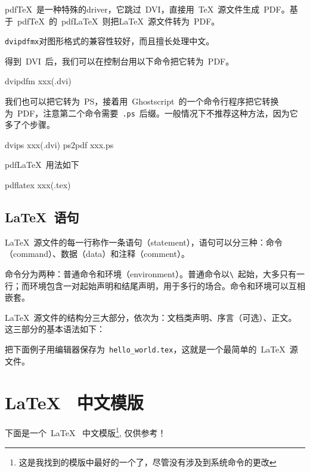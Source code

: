 pdf\TeX~是一种特殊的driver，它跳过~DVI，直接用~\TeX~源文件生成~PDF。基于~pdf\TeX~的~pdf\LaTeX~则把\LaTeX~源文件转为~PDF。

\verb|dvipdfmx|对图形格式的兼容性较好，而且擅长处理中文。

得到~DVI~后，我们可以在控制台用以下命令把它转为~PDF。
\begin{code}
dvipdfm xxx(.dvi)
\end{code}

我们也可以把它转为~PS，接着用~Ghostscript~的一个命令行程序把它转换为~PDF，注意第二个命令需要~\verb|.ps|~后缀。一般情况下不推荐这种方法，因为它多了个步骤。
\begin{code}
dvips xxx(.dvi)
ps2pdf xxx.ps
\end{code}

pdf\LaTeX~用法如下
\begin{code}
pdflatex xxx(.tex)
\end{code}

\subsection{\LaTeX~语句}
\LaTeX~源文件的每一行称作一条语句（statement），语句可以分三种：命令（command）、数据（data）和注释（comment）。

命令分为两种：普通命令和环境（environment）。普通命令以\verb|\|~起始，大多只有一行；而环境包含一对起始声明和结尾声明，用于多行的场合。命令和环境可以互相嵌套。

\LaTeX~源文件的结构分三大部分，依次为：文档类声明、序言（可选）、正文。
这三部分的基本语法如下：

把下面例子用编辑器保存为~\verb|hello_world.tex|，这就是一个最简单的~\LaTeX~源文件。

\section{\LaTeX~ 中文模版}
\label{sec:template}
下面是一个~\LaTeX~ 中文模版\footnote{这是我找到的模版中最好的一个了，尽管没有涉及到系统命令的更改}, 仅供参考！

